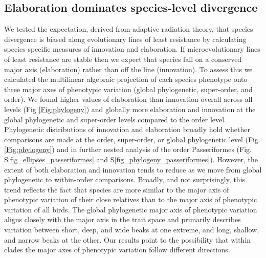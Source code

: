 \documentclass[12pt,letterpaper]{article}
\begin{document}
\subsection{Elaboration dominates species-level divergence}
We tested the expectation, derived from adaptive radiation theory, that species divergence is biased along evolutionary lines of least resistance by calculating species-specific measures of innovation and elaboration.
If microevolutionary lines of least resistance are stable then we expect that species fall on a conserved major axis (elaboration) rather than off the line (innovation).
To assess this we calculated the multilinear algebraic projection of each species phenotype onto three major axes of phenotypic variation (global phylogenetic, super-order, and order).
We found higher values of elaboration than innovation overall across all levels (Fig \ref{Fig:phylogeny}) and globally more elaboration and innovation at the global phylogenetic and super-order levels compared to the order level.
Phylogenetic distributions of innovation and elaboration broadly hold whether comparisons are made at the order, super-order, or global phylogenetic level (Fig. \ref{Fig:phylogeny})%
 and in further nested analysis of the order Passeriformes (Fig. S\ref{fig_ellipses_passeriformes} and S\ref{fig_phylogeny_passeriformes}).
However, the extent of both elaboration and innovation tends to reduce as we move from global phylogenetic to within-order comparisons.
Broadly, and not surprisingly, this trend reflects the fact that species are more similar to the major axis of phenotypic variation of their close relatives than to the major axis of phenotypic variation of all birds.
The global phylogenetic major axis of phenotypic variation aligns closely with the major axis in the trait space and primarily describes variation between short, deep, and wide beaks at one extreme, and long, shallow, and narrow beaks at the other.
Our results point to the possibility that within clades the major axes of phenotypic variation follow different directions. 
\end{document}
